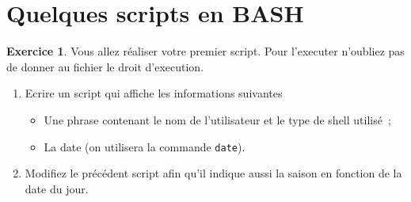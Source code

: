 \documentclass[a4paper,11pt]{article}
\newcommand{\itemb}{\item[$\bullet$]}
\theoremstyle{plain}
\theoremstyle{definition}
\newtheorem{exercice}{Exercice}
\begin{document}
\section{Quelques scripts en BASH}


\begin{exercice}

 Vous allez réaliser votre premier script. Pour l'executer n'oubliez pas de donner au fichier le droit d'execution.
\begin{enumerate}
\item Ecrire un script qui affiche les informations suivantes
\begin{itemize}
\itemb Une phrase contenant le nom de l'utilisateur et le type de shell utilisé~;
\itemb La date (on utilisera la commande \verb|date|).
\end{itemize}
\item Modifiez le précédent script afin qu'il indique aussi la saison en fonction de la date du jour.
\end{enumerate}
\end{exercice}
\end{document}
